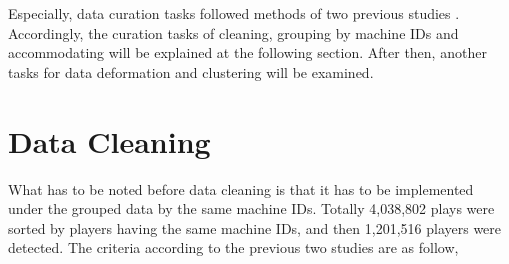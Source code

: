 \documentclass[12pt,a4paper]{report}
\begin{document}
Especially, data curation tasks followed methods of two previous studies \cite{stafford2014tracing, stafford2016testing}. Accordingly, the curation tasks of cleaning, grouping by machine IDs and accommodating will be explained at the following section. After then, another tasks for data deformation and clustering will be examined.

\begin{comment}
which certified "the relationship between the practice amount and subsequent performance, and between practice spacing and subsequent performance" and "the consolidation effect for skill learning". In order for these analyses, unnecessary information contained in the data set had to be filtered, and additionally, the new variables were augmented by manifesting some hidden features in the same player through those two analyses.

In gratitude, filtering methods on the data source was already regularized in some degree by Stafford et al. (2014; 2016).
\end{comment}

\section{Data Cleaning}

What has to be noted before data cleaning is that it has to be implemented under the grouped data by the same machine IDs. Totally 4,038,802 plays were sorted by players having the same machine IDs, and then 1,201,516 players were detected. The criteria according to the previous two studies \cite{stafford2014tracing, stafford2016testing} are as follow,

\end{document}
